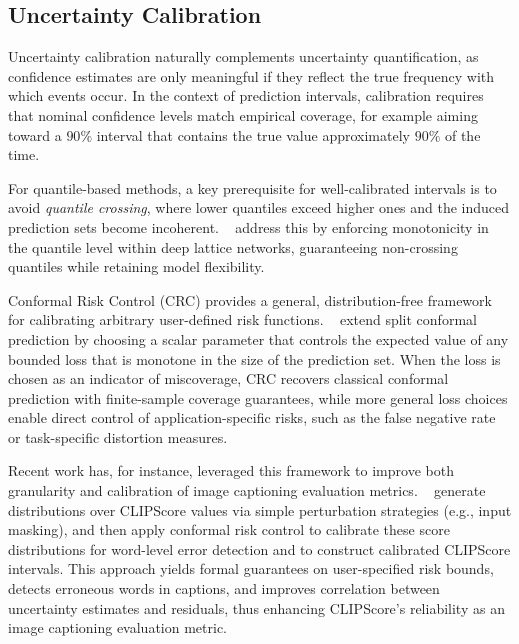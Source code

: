 \documentclass[11pt]{article}
\begin{document}
\vspace{-0.13cm}
\subsection{Uncertainty Calibration}
\vspace{-0.13cm}

Uncertainty calibration naturally complements uncertainty quantification, as confidence estimates are only meaningful if they reflect the true frequency with which events occur. In the context of prediction intervals, calibration requires that nominal confidence levels match empirical coverage, for example aiming toward a \(90\%\) interval that contains the true value approximately \(90\%\) of the time. 

For quantile-based methods, a key prerequisite for well-calibrated intervals is to avoid \emph{quantile crossing}, where lower quantiles exceed higher ones and the induced prediction sets become incoherent. ~\citet{narayan2021regularization} address this by enforcing monotonicity in the quantile level within deep lattice networks, guaranteeing non-crossing quantiles while retaining model flexibility.

Conformal Risk Control (CRC) provides a general, distribution-free framework for calibrating arbitrary user-defined risk functions. ~\citet{angelopoulos2022conformal} extend split conformal prediction by choosing a scalar parameter that controls the expected value of any bounded loss that is monotone in the size of the prediction set. When the loss is chosen as an indicator of miscoverage, CRC recovers classical conformal prediction with finite-sample coverage guarantees, while more general loss choices enable direct control of application-specific risks, such as the false negative rate or task-specific distortion measures.

Recent work has, for instance, leveraged this framework to improve both granularity and calibration of image captioning evaluation metrics. ~\citet{gomes2025conformal} generate distributions over CLIPScore values via simple perturbation strategies (e.g., input masking), and then apply conformal risk control to calibrate these score distributions for word-level error detection and to construct calibrated CLIPScore intervals. This approach yields formal guarantees on user-specified risk bounds, detects erroneous words in captions, and improves correlation between uncertainty estimates and residuals, thus enhancing CLIPScore's reliability as an image captioning evaluation metric.
\end{document}
